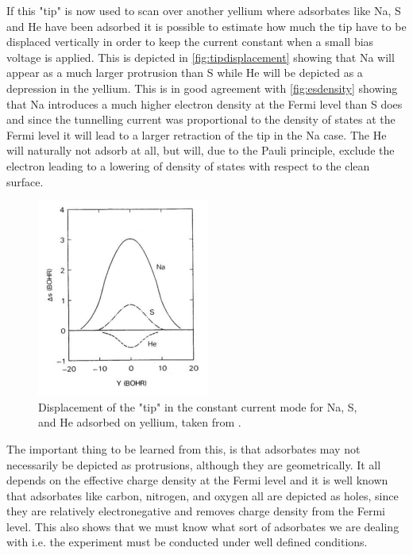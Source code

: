If this "tip" is now used to scan over another yellium where adsorbates like Na, S and He have been adsorbed it is possible to estimate how much the tip have to be displaced vertically in order to keep the current constant when a small bias voltage is applied. This is depicted in \autoref{fig:tipdisplacement} showing that Na will appear as a much larger protrusion than S while He will be depicted as a depression in the yellium. This is in good agreement with \autoref{fig:esdensity} showing that Na introduces a much higher electron density at the Fermi level than  S does and since the tunnelling current was proportional to the density of states at the Fermi level it will lead to a larger retraction of the tip in the Na case. The He will naturally not adsorb at all, but will, due to the Pauli principle, exclude the electron leading to a lowering of density of states with respect to the clean surface.

\begin{figure}[h!]
	\begin{center}
	\includegraphics[scale=4]{figures/10_06.png}
	\caption{Displacement of the "tip" in the  constant current mode for Na, S, and He adsorbed on yellium, taken from \cite{Lang}.}
	\label{fig:tipdisplacement}
	\end{center}
\end{figure}

The important thing to be learned from this, is that adsorbates may not necessarily be depicted as protrusions, although they are geometrically. It all depends on the effective charge density at the Fermi level and it is well known that adsorbates like carbon, nitrogen, and  oxygen all are depicted as holes, since they are relatively electronegative and removes charge density from the Fermi level. This also shows that we must know what sort of adsorbates we are dealing with i.e. the experiment must be conducted under well defined conditions.

